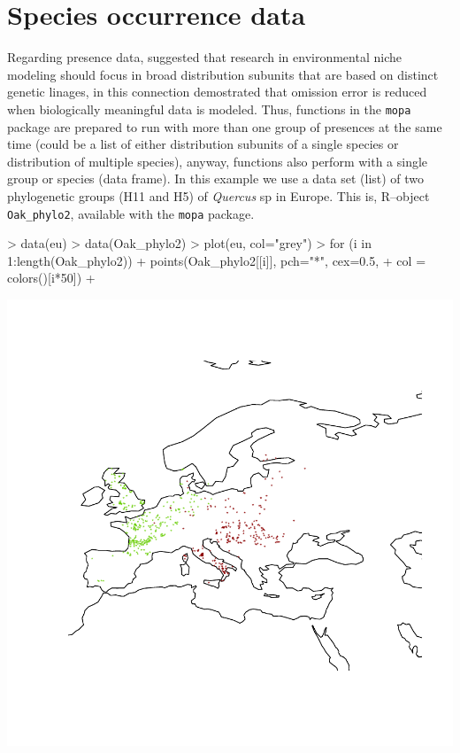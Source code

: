 \documentclass[10pt,a4paper]{report}
\begin{document}
\section{Species occurrence data}

Regarding presence data, \citet{hernandez_effect_2006} suggested that research in environmental niche modeling should focus in broad distribution subunits that are based on distinct genetic linages, in this connection \citet{gonzalez_population_2011} demostrated that omission error is reduced when biologically meaningful data is modeled. Thus, functions in the \texttt{mopa} package are prepared to run with more than one group of presences at the same time (could be a list of either distribution subunits of a single species or distribution of multiple species), anyway, functions also perform with a single group or species (data frame). In this example we use a data set (list) of two phylogenetic groups (H11 and H5) of \textit{Quercus} sp in Europe. This is, R--object \texttt{Oak\_phylo2}, available with the \texttt{mopa} package. 


\begin{Schunk}
\begin{Sinput}
> data(eu)
> data(Oak_phylo2)
> plot(eu, col="grey")
> for (i in 1:length(Oak_phylo2)){
+   points(Oak_phylo2[[i]], pch="*", cex=0.5, 
+          col = colors()[i*50])
+ }
\end{Sinput}
\end{Schunk}
\includegraphics{mopa-mopa2}
\end{document}
